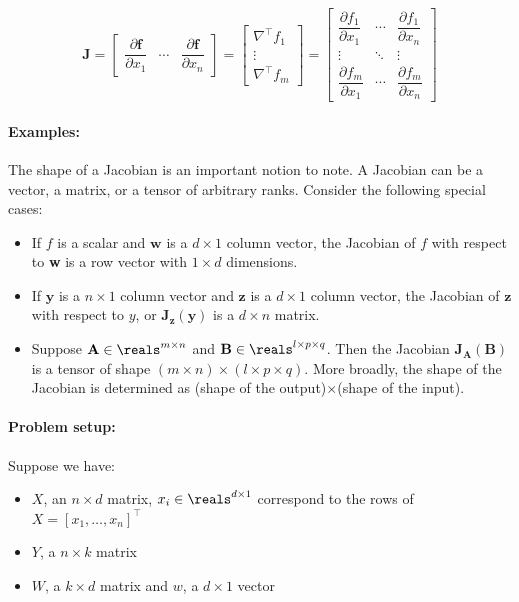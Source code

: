 $$
\mathbf J = \begin{bmatrix}
  \dfrac{\partial \mathbf{f}}{\partial x_1} & \cdots & \dfrac{\partial \mathbf{f}}{\partial x_n}
\end{bmatrix}
= \begin{bmatrix}
  \nabla^{\top} f_1 \\  
  \vdots \\
  \nabla^{\top} f_m   
\end{bmatrix}
= \begin{bmatrix}
    \dfrac{\partial f_1}{\partial x_1} & \cdots & \dfrac{\partial f_1}{\partial x_n}\\
    \vdots                             & \ddots & \vdots\\
    \dfrac{\partial f_m}{\partial x_1} & \cdots & \dfrac{\partial f_m}{\partial x_n}
\end{bmatrix}
$$


\noindent
\paragraph{Examples:}The shape of a Jacobian is an important notion to note. A Jacobian can be a vector, a matrix, or a tensor of arbitrary ranks. Consider the following special cases: 
\begin{itemize}
    \item If $f$ is a scalar and $\textbf{w}$ is a $d \times 1$ column vector, the Jacobian of $f$ with respect to \textbf{w} is a row vector with $1 \times d$ dimensions.
    \item If $\textbf{y}$ is a $n \times 1$ column vector and $\textbf{z}$ is a $d \times 1$ column vector, the Jacobian of $\mathbf{z}$ with respect to $y$, or $\textbf{J}_\textbf{z}(\textbf{y})$ is a $d \times n$ matrix.  
    \item Suppose $\textbf{A} \in \reals^{m\times n}$ and  $\mathbf{B} \in \reals^{l\times p \times q}$. Then  the Jacobian $\textbf{J}_\textbf{A}({\textbf{B}})$  is a tensor of shape $(m \times n) \times (l \times p \times q)$. 
    More broadly, the shape of the Jacobian is determined as (shape of the output)$\times$(shape of the input).
\end{itemize}



\noindent \paragraph{Problem setup:}Suppose we have:
\begin{itemize}
    \item $X$, an $n \times d$ matrix, $x_i \in \reals^{d\times 1}$ correspond to the rows of $X = [x_1, \hdots, x_n]^\top$
    \item $Y$, a $n \times k$ matrix
    \item $W$, a $k \times d$ matrix and $w$, a $d \times 1$ vector
\end{itemize}

